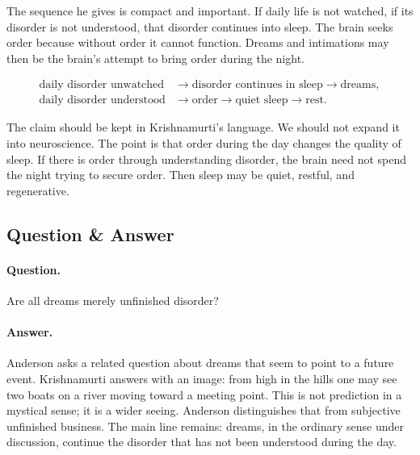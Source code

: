 The sequence he gives is compact and important. If daily life is not watched, if its disorder is not understood, that disorder continues into sleep. The brain seeks order because without order it cannot function. Dreams and intimations may then be the brain's attempt to bring order during the night.

\begin{align}
\text{daily disorder unwatched}
&\longrightarrow
\text{disorder continues in sleep}
\longrightarrow
\text{dreams},\\
\text{daily disorder understood}
&\longrightarrow
\text{order}
\longrightarrow
\text{quiet sleep}
\longrightarrow
\text{rest}.
\end{align}

The claim should be kept in Krishnamurti's language. We should not expand it into neuroscience. The point is that order during the day changes the quality of sleep. If there is order through understanding disorder, the brain need not spend the night trying to secure order. Then sleep may be quiet, restful, and regenerative.

\subsection{Question \& Answer}

\paragraph{Question.}
Are all dreams merely unfinished disorder?

\paragraph{Answer.}
Anderson asks a related question about dreams that seem to point to a future event. Krishnamurti answers with an image: from high in the hills one may see two boats on a river moving toward a meeting point. This is not prediction in a mystical sense; it is a wider seeing. Anderson distinguishes that from subjective unfinished business. The main line remains: dreams, in the ordinary sense under discussion, continue the disorder that has not been understood during the day.

